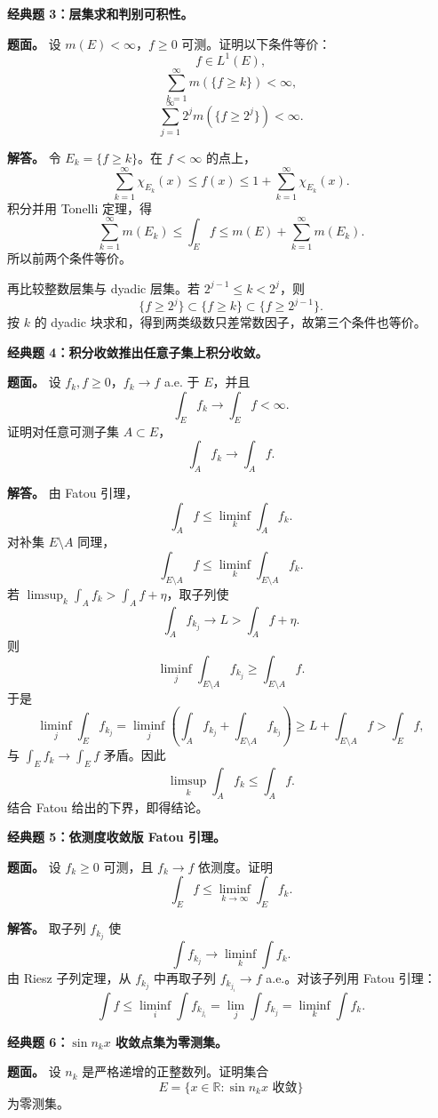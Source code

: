\documentclass[
UTF8]{ctexart}
\newcommand{\impA}{\hspace{0.4em}{\small\textcolor{impAColor}{\textbf{[A 核心]}}}}
\newcommand{\impB}{\hspace{0.4em}{\small\textcolor{impBColor}{\textbf{[B 重要]}}}}
\newcommand{\impC}{\hspace{0.4em}{\small\textcolor{impCColor}{\textbf{[C 专题]}}}}
\begin{document}
\textbf{经典题 3：层集求和判别可积性。}\impA

\textbf{题面。} 设 \(m(E)<\infty\)，\(f\ge0\) 可测。证明以下条件等价：
\[
  f\in L^1(E),
\]
\[
  \sum_{k=1}^{\infty}m(\{f\ge k\})<\infty,
\]
\[
  \sum_{j=1}^{\infty}2^j m(\{f\ge2^j\})<\infty.
\]

\textbf{解答。} 令 \(E_k=\{f\ge k\}\)。在 \(f<\infty\) 的点上，
\[
  \sum_{k=1}^{\infty}\chi_{E_k}(x)\le f(x)
  \le 1+\sum_{k=1}^{\infty}\chi_{E_k}(x).
\]
积分并用 Tonelli 定理，得
\[
  \sum_{k=1}^{\infty}m(E_k)\le \int_E f
  \le m(E)+\sum_{k=1}^{\infty}m(E_k).
\]
所以前两个条件等价。

再比较整数层集与 dyadic 层集。若 \(2^{j-1}\le k<2^j\)，则
\[
  \{f\ge2^j\}\subset\{f\ge k\}\subset\{f\ge2^{j-1}\}.
\]
按 \(k\) 的 dyadic 块求和，得到两类级数只差常数因子，故第三个条件也等价。

\textbf{经典题 4：积分收敛推出任意子集上积分收敛。}\impB

\textbf{题面。} 设 \(f_k,f\ge0\)，\(f_k\to f\) a.e. 于 \(E\)，并且
\[
  \int_E f_k\to\int_E f<\infty.
\]
证明对任意可测子集 \(A\subset E\)，
\[
  \int_A f_k\to\int_A f.
\]

\textbf{解答。} 由 Fatou 引理，
\[
  \int_A f\le \liminf_k\int_A f_k.
\]
对补集 \(E\setminus A\) 同理，
\[
  \int_{E\setminus A} f\le \liminf_k\int_{E\setminus A} f_k.
\]
若 \(\limsup_k\int_A f_k>\int_A f+\eta\)，取子列使
\[
  \int_A f_{k_j}\to L>\int_A f+\eta.
\]
则
\[
  \liminf_j\int_{E\setminus A}f_{k_j}\ge\int_{E\setminus A}f.
\]
于是
\[
  \liminf_j\int_E f_{k_j}
  =\liminf_j\left(\int_A f_{k_j}+\int_{E\setminus A}f_{k_j}\right)
  \ge L+\int_{E\setminus A}f
  >\int_E f,
\]
与 \(\int_E f_k\to\int_E f\) 矛盾。因此
\[
  \limsup_k\int_A f_k\le\int_A f.
\]
结合 Fatou 给出的下界，即得结论。

\textbf{经典题 5：依测度收敛版 Fatou 引理。}\impA

\textbf{题面。} 设 \(f_k\ge0\) 可测，且 \(f_k\to f\) 依测度。证明
\[
  \int_E f\le \liminf_{k\to\infty}\int_E f_k.
\]

\textbf{解答。} 取子列 \(f_{k_j}\) 使
\[
  \int f_{k_j}\to \liminf_k\int f_k.
\]
由 Riesz 子列定理，从 \(f_{k_j}\) 中再取子列 \(f_{k_{j_i}}\to f\) a.e.。对该子列用 Fatou 引理：
\[
  \int f\le \liminf_i\int f_{k_{j_i}}
  =\lim_j\int f_{k_j}
  =\liminf_k\int f_k.
\]

\textbf{经典题 6：\(\sin n_kx\) 收敛点集为零测集。}\impC

\textbf{题面。} 设 \(n_k\) 是严格递增的正整数列。证明集合
\[
  E=\{x\in\mathbb R:\sin n_kx\text{ 收敛}\}
\]
为零测集。
\end{document}
